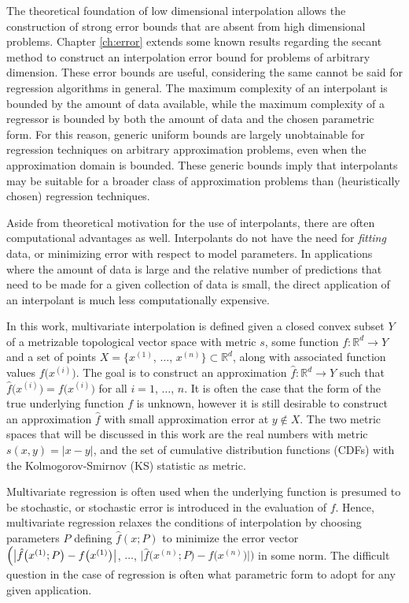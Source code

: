 The theoretical foundation of low dimensional interpolation allows the
construction of strong error bounds that are absent from high
dimensional problems. Chapter \ref{ch:error} extends some known
results regarding the secant method \cite{dennis1996numerical} to
construct an interpolation error bound for problems of arbitrary
dimension. These error bounds are useful, considering the same cannot
be said for regression algorithms in general. The maximum complexity
of an interpolant is bounded by the amount of data available, while
the maximum complexity of a regressor is bounded by both the amount of
data and the chosen parametric form. For this reason, generic uniform
bounds are largely unobtainable for regression techniques on arbitrary
approximation problems, even when the approximation domain is
bounded. These generic bounds imply that interpolants may be suitable
for a broader class of approximation problems than (heuristically
chosen) regression techniques.

Aside from theoretical motivation for the use of interpolants, there
are often computational advantages as well. Interpolants do not have
the need for \textit{fitting} data, or minimizing error with respect
to model parameters. In applications where the amount of data is large
and the relative number of predictions that need to be made for a
given collection of data is small, the direct application of an
interpolant is much less computationally expensive.

In this work, multivariate interpolation is defined given a closed
convex subset $Y$ of a metrizable topological vector space with metric
$s$, some function $f:\mathbb{R}^d \rightarrow Y$ and a set of points
$X = \bigl\{x^{(1)}$, $\ldots$, $x^{(n)}\bigr\} \subset \mathbb{R}^d$,
along with associated function values $f\bigl(x^{(i)}\bigr)$. The goal
is to construct an approximation $\hat f: \mathbb{R}^d \rightarrow Y$
such that $\hat f\bigl(x^{(i)}\bigr) = f\bigl(x^{(i)}\bigr)$ for all
$i = 1$, $\ldots$, $n$. It is often the case that the form of the true
underlying function $f$ is unknown, however it is still desirable to
construct an approximation $\hat f$ with small approximation error at
$y \notin X$. The two metric spaces that will be discussed in this
work are the real numbers with metric $s(x,y) = |x-y|$, and the set of
cumulative distribution functions (CDFs) with the Kolmogorov-Smirnov
(KS) statistic \cite{lilliefors1967kolmogorov} as metric.

Multivariate regression is often used when the underlying function is
presumed to be stochastic, or stochastic error is introduced in the
evaluation of $f$. Hence, multivariate regression relaxes the
conditions of interpolation by choosing parameters $P$ defining $\hat
f(x;P)$ to minimize the error vector $\Bigl( \bigl | \hat f
\bigl(x^{(1)};P\bigr) - f\bigl(x^{(1)}\bigr) \bigr|$, $\ldots$, $\bigl
| \hat f \bigl(x^{(n)}; P\bigr) - f\bigl(x^{(n)}\bigr) \bigr | \Bigr)$
in some norm. The difficult question in the case of regression is
often what parametric form to adopt for any given application.

